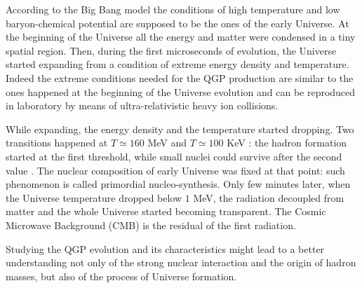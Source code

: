 According to the Big Bang model the conditions of high temperature and low baryon-chemical potential are supposed to be the ones of the early Universe.
At the beginning of the Universe all the energy and matter were condensed in a tiny spatial region.
Then, during the first microseconds of evolution, the Universe started expanding from a condition of extreme energy density and temperature.
Indeed the extreme conditions needed for the QGP production are similar to the ones happened at the beginning of the Universe evolution and can be reproduced in laboratory by means of ultra-relativistic heavy ion collisions.

While expanding, the energy density and the temperature started dropping.
Two transitions happened at $T\simeq160$ MeV and $T\simeq100$ KeV \cite{Kapoyannis:2017hcz}: the hadron formation started at the first threshold, while small nuclei could survive after the second value \cite{Dumitru:2000sc}.
The nuclear composition of early Universe was fixed at that point: such phenomenon is called primordial nucleo-synthesis.
Only few minutes later, when the Universe temperature dropped below $1$ MeV, the radiation decoupled from matter and the whole Universe started becoming transparent.
The Cosmic Microwave Background (CMB) is the residual of the first radiation.

Studying the QGP evolution and its characteristics might lead to a better understanding not only of the strong nuclear interaction and the origin of hadron masses, but also of the process of Universe formation.

